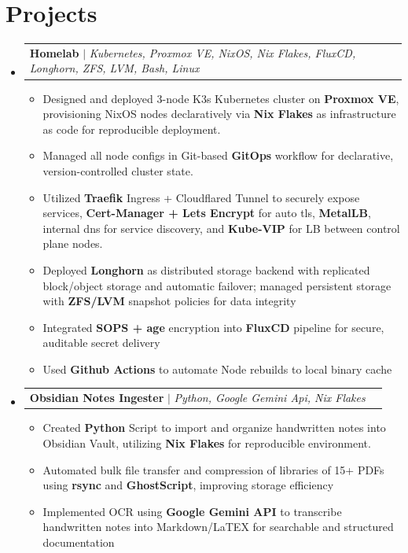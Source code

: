 \documentclass[letterpaper,11pt]{article}
\makeatletter
\newcommand{\resumeItem}[1]{
  \item\small{
    {#1 \vspace{-2pt}}
  }
}
\newcommand{\resumeProjectHeading}[2]{
    \item
    \begin{tabular*}{0.97\textwidth}{l@{\extracolsep{\fill}}r}
      \small#1 & #2 \\
    \end{tabular*}\vspace{-7pt}
}
\newcommand{\resumeSubHeadingListStart}{\begin{itemize}[leftmargin=0.15in, label={}]}
\newcommand{\resumeSubHeadingListEnd}{\end{itemize}}
\newcommand{\resumeItemListStart}{\begin{itemize}}
\newcommand{\resumeItemListEnd}{\end{itemize}\vspace{-5pt}}
\makeatother
\begin{document}
\section{Projects}
    \resumeSubHeadingListStart
      \resumeProjectHeading
          {\textbf{Homelab} $|$ \emph{Kubernetes, Proxmox VE, NixOS, Nix Flakes, FluxCD, Longhorn, ZFS, LVM, Bash, Linux}}{}
          \resumeItemListStart
            \resumeItem{Designed and deployed 3-node K3s Kubernetes cluster on \textbf{Proxmox VE}, provisioning NixOS nodes declaratively via \textbf{Nix Flakes} as infrastructure as code for reproducible deployment.}
            \resumeItem{Managed all node configs in Git-based \textbf{GitOps} workflow for declarative, version-controlled cluster state.}
            \resumeItem{Utilized \textbf{Traefik} Ingress + Cloudflared Tunnel to securely expose services, \textbf{Cert-Manager + Lets Encrypt} for auto tls, \textbf{MetalLB}, internal dns for service discovery, and \textbf{Kube-VIP} for LB between control plane nodes.}
            \resumeItem{Deployed \textbf{Longhorn} as distributed storage backend with replicated block/object storage and automatic failover; managed persistent storage with \textbf{ZFS/LVM} snapshot policies for data integrity}
            \resumeItem{Integrated \textbf{SOPS + age} encryption into \textbf{FluxCD} pipeline for secure, auditable secret delivery}
            \resumeItem{Used \textbf{Github Actions} to automate Node rebuilds to local binary cache}
          \resumeItemListEnd
      \resumeProjectHeading{
        \textbf{Obsidian Notes Ingester} $|$ \emph{Python, Google Gemini Api, Nix Flakes}}{}
          \resumeItemListStart
          \resumeItem{Created \textbf{Python} Script to import and organize handwritten notes into Obsidian Vault, utilizing \textbf{Nix Flakes} for reproducible environment.}
          \resumeItem{Automated bulk file transfer and compression of libraries of 15+ PDFs using \textbf{rsync} and \textbf{GhostScript}, improving storage efficiency}
          \resumeItem{Implemented OCR using \textbf{Google Gemini API} to transcribe handwritten notes into Markdown/LaTEX for searchable and structured documentation}
        \resumeItemListEnd
    \resumeSubHeadingListEnd





\end{document}
